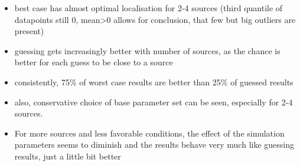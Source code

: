 \begin{itemize}
	\item best case has almost optimal localisation for 2-4 sources (third quantile of datapoints still 0, mean>0 allows for conclusion, that few but big outliers are present)
	\item guessing gets increasingly better with number of sources, as the chance is better for each guess to be close to a source
	\item consistently, 75\% of worst case results are better than 25\% of guessed results
	\item also, conservative choice of base parameter set can be seen, especially for 2-4 sources.
	\item For more sources and less favorable conditions, the effect of the simulation parameters seems to diminish and the results behave very much like guessing results, just a little bit better
\end{itemize}
